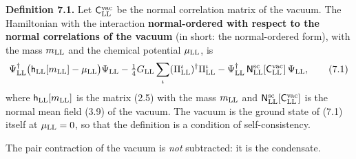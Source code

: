 \documentclass[
  10pt,
]{article}
\begin{document}
\textbf{Definition 7.1.} Let \(\mathsf C^{\rm vac}_{\rm LL}\) be the
normal correlation matrix of the vacuum. The Hamiltonian with the
interaction \textbf{normal-ordered with respect to the normal
correlations of the vacuum} (in short: the normal-ordered form), with
the mass \(m_{\rm LL}\) and the chemical potential \(\mu_{\rm LL}\), is
\[\Psi^\dagger_{\rm LL}\big(\mathsf h_{\rm LL}[m_{\rm LL}]-\mu_{\rm LL}\big)\Psi_{\rm LL}-\tfrac14G_{\rm LL}\sum_\iota(\Pi^\iota_{\rm LL})^\dagger\Pi^\iota_{\rm LL}
-\Psi^\dagger_{\rm LL}\,\mathsf N^{\rm sc}_{\rm LL}[\mathsf C^{\rm vac}_{\rm LL}]\,\Psi_{\rm LL},\tag{7.1}\]
where \(\mathsf h_{\rm LL}[m_{\rm LL}]\) is the matrix (2.5) with the
mass \(m_{\rm LL}\) and
\(\mathsf N^{\rm sc}_{\rm LL}[\mathsf C^{\rm vac}_{\rm LL}]\) is the
normal mean field (3.9) of the vacuum. The vacuum is the ground state of
(7.1) itself at \(\mu_{\rm LL}=0\), so that the definition is a
condition of self-consistency.

The pair contraction of the vacuum is \emph{not} subtracted: it is the
condensate.
\end{document}
